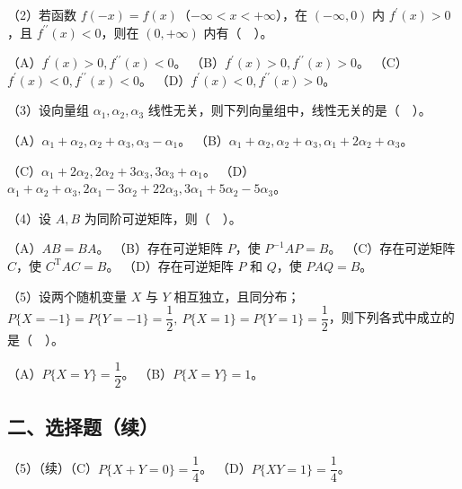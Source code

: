 \documentclass[UTF8,12pt]{ctexart}
\begin{document}
（2）若函数 \(\displaystyle f(-x)=f(x)\)（\(\displaystyle -\infty<x<+\infty\)），在 \(\displaystyle (-\infty,\allowbreak 0)\) 内 \(\displaystyle f^{\prime}(x)>0\)，且 \(\displaystyle f^{\prime\prime}(x)<0\)，则在 \(\displaystyle (0,\allowbreak +\infty)\) 内有（　）。


（A）\(\displaystyle f^{\prime}(x)>0,\allowbreak f^{\prime\prime}(x)<0\)。 （B）\(\displaystyle f^{\prime}(x)>0,\allowbreak f^{\prime\prime}(x)>0\)。 （C）\(\displaystyle f^{\prime}(x)<0,\allowbreak f^{\prime\prime}(x)<0\)。 （D）\(\displaystyle f^{\prime}(x)<0,\allowbreak f^{\prime\prime}(x)>0\)。


（3）设向量组 \(\displaystyle \alpha_1,\allowbreak \alpha_2,\allowbreak \alpha_3\) 线性无关，则下列向量组中，线性无关的是（　）。


（A）\(\displaystyle \alpha_1+\alpha_2,\allowbreak \alpha_2+\alpha_3,\allowbreak \alpha_3-\alpha_1\)。 （B）\(\displaystyle \alpha_1+\alpha_2,\allowbreak \alpha_2+\alpha_3,\allowbreak \alpha_1+2\alpha_2+\alpha_3\)。


（C）\(\displaystyle \alpha_1+2\alpha_2,\allowbreak 2\alpha_2+3\alpha_3,\allowbreak 3\alpha_3+\alpha_1\)。 （D）\(\displaystyle \alpha_1+\alpha_2+\alpha_3,\allowbreak 2\alpha_1-3\alpha_2+22\alpha_3,\allowbreak 3\alpha_1+5\alpha_2-5\alpha_3\)。


（4）设 \(\displaystyle A,\allowbreak B\) 为同阶可逆矩阵，则（　）。


（A）\(\displaystyle AB=BA\)。 （B）存在可逆矩阵 \(\displaystyle P\)，使 \(\displaystyle P^{-1}AP=B\)。 （C）存在可逆矩阵 \(\displaystyle C\)，使 \(\displaystyle C^{\mathrm T}AC=B\)。 （D）存在可逆矩阵 \(\displaystyle P\) 和 \(\displaystyle Q\)，使 \(\displaystyle PAQ=B\)。


（5）设两个随机变量 \(\displaystyle X\) 与 \(\displaystyle Y\) 相互独立，且同分布；\(\displaystyle P\{X=-1\}=P\{Y=-1\}=\dfrac{\displaystyle 1}{\displaystyle 2},\allowbreak \ P\{X=1\}=P\{Y=1\}=\dfrac{\displaystyle 1}{\displaystyle 2}\)，则下列各式中成立的是（　）。


（A）\(\displaystyle P\{X=Y\}=\dfrac{\displaystyle 1}{\displaystyle 2}\)。 （B）\(\displaystyle P\{X=Y\}=1\)。


\subsection*{二、选择题（续）}

（5）（续）（C）\(\displaystyle P\{X+Y=0\}=\dfrac{\displaystyle 1}{\displaystyle 4}\)。 （D）\(\displaystyle P\{XY=1\}=\dfrac{\displaystyle 1}{\displaystyle 4}\)。
\end{document}

